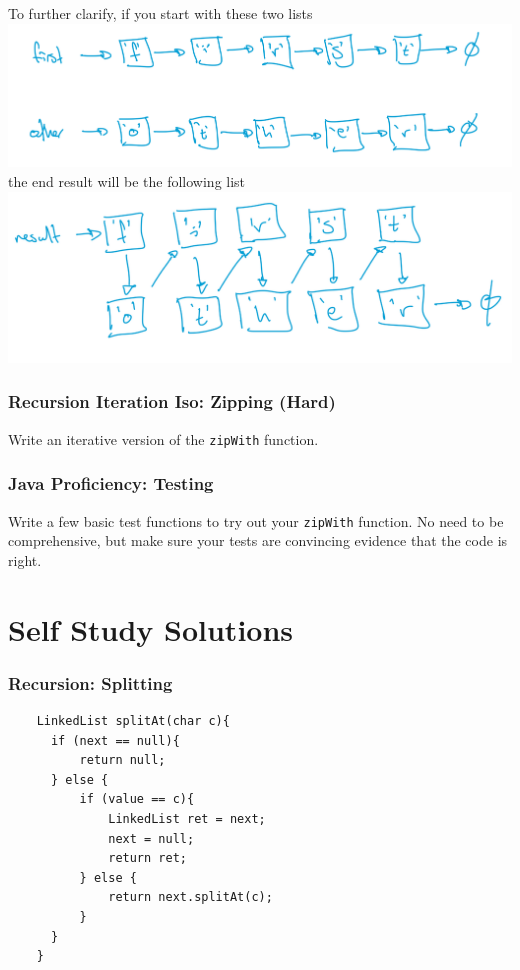 \documentclass[twoside=false,DIV=14]{scrartcl}
\begin{document}
  To further clarify, if you start with these two lists\\
  \includegraphics[width=\textwidth]{./week2_2.png}\\
  the end result will be the following list\\
  \includegraphics[width=\textwidth]{./week2_3.png}

  \section{Recursion Iteration Iso: Zipping (Hard)}
  Write an iterative version of the \lstinline|zipWith| function.

  \section{Java Proficiency: Testing}
  Write a few basic test functions to try out your \lstinline|zipWith| function.  No need to be comprehensive, but make sure your tests are convincing evidence that the code is right.
  
  \newpage\setcounter{section}{0}
  \part*{Self Study Solutions}
  \section{Recursion: Splitting}
  \begin{lstlisting}
    LinkedList splitAt(char c){
      if (next == null){
          return null;
      } else {
          if (value == c){
              LinkedList ret = next;
              next = null;
              return ret;
          } else {
              return next.splitAt(c);
          }
      }
    }
  \end{lstlisting}
\end{document}
